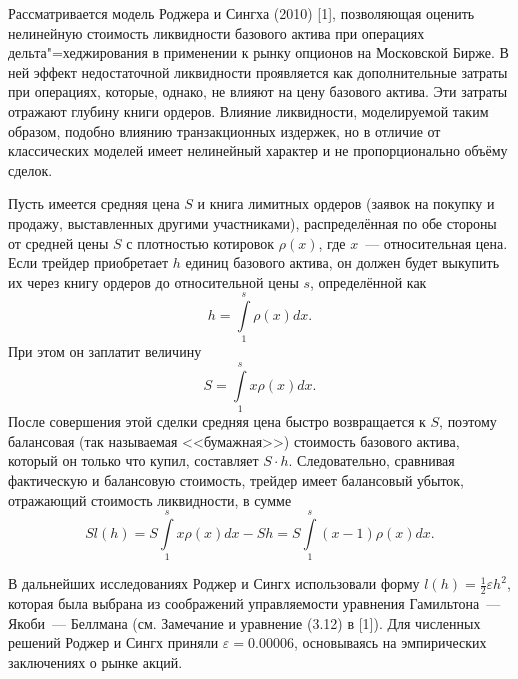 \vzmscaption

Рассматривается модель Роджера и Сингха (2010) [1], позволяющая оценить нелинейную стоимость ликвидности базового актива при операциях дельта"=хеджирования в применении к рынку опционов на Московской Бирже.
В ней эффект недостаточной ликвидности проявляется как дополнительные затраты при операциях, которые, однако, не влияют на цену базового актива. Эти затраты отражают глубину книги ордеров. Влияние ликвидности, моделируемой таким образом, подобно влиянию транзакционных издержек, но в отличие от классических моделей имеет нелинейный характер и не пропорционально объёму сделок.

Пусть имеется средняя цена $S$ и книга лимитных ордеров (заявок на покупку и продажу, выставленных другими участниками), распределённая по обе стороны от средней цены $S$ с плотностью котировок $\rho(x)$, где $x$~--- относительная цена. Если трейдер приобретает $h$ единиц базового актива, он должен будет выкупить их через книгу ордеров до относительной цены $s$, определённой как
\begin{equation*}
h = \int\limits_1^s \rho(x)dx.
\end{equation*}
При этом он заплатит величину
\begin{equation*}
S=\int\limits_1^s x \rho(x) dx.
\end{equation*}
После совершения этой сделки средняя цена быстро возвращается к $S$, поэтому балансовая (так называемая <<бумажная>>) стоимость базового актива, который он только что купил, составляет $S \cdot h$. Следовательно, сравнивая фактическую и балансовую стоимость, трейдер имеет балансовый убыток, отражающий стоимость ликвидности, в сумме
\begin{equation*}
S l(h) = S \int\limits_1^s x \rho(x) dx - Sh = S \int\limits_1^s (x-1) \rho(x) dx.
\end{equation*}

В дальнейших исследованиях Роджер и Сингх использовали форму $l (h) = \frac12 \varepsilon h^2$, которая была выбрана из соображений управляемости уравнения Гамильтона~--- Якоби~--- Беллмана (см. Замечание и уравнение (3.12) в [1]). Для численных решений Роджер и Сингх приняли $\varepsilon = 0.00006$, основываясь на эмпирических заключениях о рынке акций.

